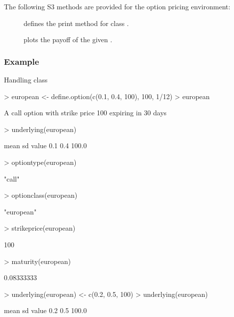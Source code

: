 The following S3 methods are provided for the option pricing environment:

\begin{description}
\item[] defines the print method for class .
\item[] plots the payoff of the given .
\end{description}

\subsubsection{Example}

\begin{Example} Handling class 
\label{ex:option}
\begin{Schunk}
\begin{Sinput}
> european <- define.option(c(0.1, 0.4, 100), 100, 1/12)
> european
\end{Sinput}
\begin{Soutput}
A call option with strike price 100
expiring in 30 days
\end{Soutput}
\begin{Sinput}
> underlying(european)
\end{Sinput}
\begin{Soutput}
 mean    sd value 
  0.1   0.4 100.0 
\end{Soutput}
\begin{Sinput}
> optiontype(european)
\end{Sinput}
\begin{Soutput}
[1] "call"
\end{Soutput}
\begin{Sinput}
> optionclass(european)
\end{Sinput}
\begin{Soutput}
[1] "european"
\end{Soutput}
\begin{Sinput}
> strikeprice(european)
\end{Sinput}
\begin{Soutput}
[1] 100
\end{Soutput}
\begin{Sinput}
> maturity(european)
\end{Sinput}
\begin{Soutput}
[1] 0.08333333
\end{Soutput}
\begin{Sinput}
> underlying(european) <- c(0.2, 0.5, 100)
> underlying(european)
\end{Sinput}
\begin{Soutput}
 mean    sd value 
  0.2   0.5 100.0 
\end{Soutput}
\end{Schunk}
\end{Example}

